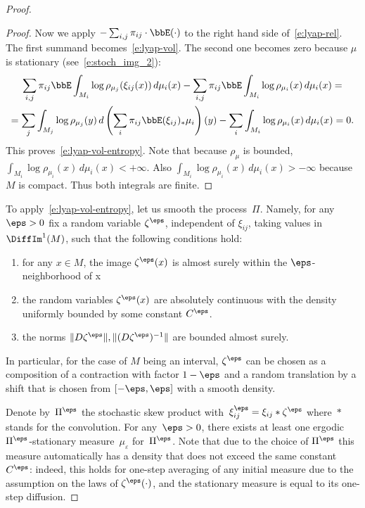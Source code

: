 \documentclass[a4paper,12pt]{amsart}
\begin{document}
\begin{proof}
\begin{proof}
Now we apply $-\sum_{i,j} \pi_{ij}\cdot \bbE (\cdot)$ to the right hand side of~\eqref{e:lyap-rel}. The first summand becomes~\eqref{e:lyap-vol}. The second one becomes zero because $\mu$ is stationary (see~\eqref{e:stoch_img_2}):
\begin{multline}\label{e:lyap-corr}
\sum_{i,j} \pi_{ij} \bbE \int_{M_i} \log \rho_{\mu_j}(\xi_{ij}(x))\, d\mu_i(x)  -  \sum_{i,j} \pi_{ij} \bbE \int_{M_i} \log \rho_{\mu_i}(x) \,d\mu_i(x) = \\
=\sum_{j} \int_{M_j} \log \rho_{\mu_j}(y)\, d\left(\sum_i \pi_{ij} \bbE (\xi_{ij})_{*} \mu_i\right)(y)   -  \sum_{i} \int_{M_i} \log \rho_{\mu_i}(x) \,d\mu_i(x) = 0.
\end{multline}
This proves~\eqref{e:lyap-vol-entropy}. Note that because $\rho_\mu$ is bounded, $\int_{M_i} \log \rho_{\mu_i}(x) \,d\mu_i(x) < +\infty$. Also $\int_{M_i} \log \rho_{\mu_i}(x) \,d\mu_i(x) > -\infty$ because $M$ is compact. Thus both integrals are finite.
\end{proof}

To apply~\eqref{e:lyap-vol-entropy}, let us smooth the process~$\Pi$. Namely, for any $\eps>0$ fix a random variable $\zeta^\eps$, independent of $\xi_{ij}$, taking values in $\DiffIm^1(M)$, such that the following conditions hold:
\begin{enumerate}
\item for any $x\in M$, the image $\zeta^\eps(x)$ is almost surely within the $\eps$-neighborhood of x
\item the random variables $\zeta^\eps(x)$ are absolutely continuous with the density uniformly bounded by some constant $C^{\eps}$.
\item the norms $\|D\zeta^\eps\|, \|(D\zeta^\eps)^{-1}\|$ are bounded almost surely.
\end{enumerate}

In particular, for the case of $M$ being an interval, $\zeta^{\eps}$ can be chosen as a composition of a contraction with factor $1-\eps$ and a random translation by a shift that is chosen from $[-\eps,\eps]$ with a smooth density.


Denote by~$\Pi^\eps$ the stochastic skew product with~$\xi_{ij}^\eps = \xi_{ij} \ast \zeta^\eps$ where~$\ast$ stands for the convolution. For any~$\eps > 0$, there exists at least one ergodic $\Pi^\eps$-stationary measure~$\mu_\varepsilon$ for~$\Pi^{\eps}$. Note that due to the choice of $\Pi^{\eps}$ this measure automatically has a density that does not exceed the same constant~$C^{\eps}$: indeed, this holds for one-step averaging of any initial measure due to the assumption on the laws of $\zeta^{\eps}(\cdot)$, and the stationary measure is equal to its one-step diffusion.


\end{proof}
\end{document}
